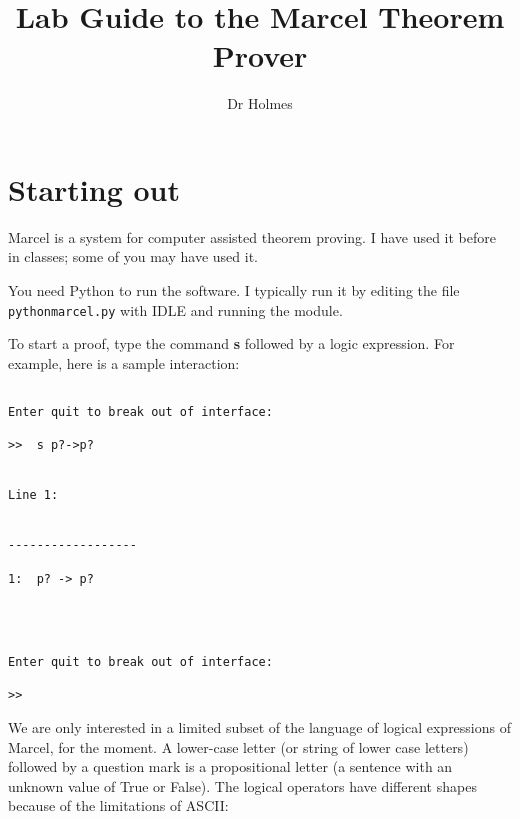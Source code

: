 \documentclass[12pt]{article}
\title{Lab Guide to the Marcel Theorem Prover}
\author{Dr Holmes}
\begin{document}
\maketitle

\tableofcontents

\section{Starting out}

Marcel is a system for computer assisted theorem proving.  I have used it before in classes; some of you may have used it.

You need Python to run the software.  I typically run it by editing the file {\tt pythonmarcel.py} with IDLE and running the module.

To start a proof, type the command {\bf s} followed by a logic expression.  For example, here is a sample interaction:

\begin{verbatim}

Enter quit to break out of interface:

>>  s p?->p?


Line 1:


------------------

1:  p? -> p?  




Enter quit to break out of interface:

>>  

\end{verbatim}

We are only interested in a limited subset of the language of logical expressions of Marcel, for the moment.  A lower-case letter (or string of lower case letters) followed by a question mark is a propositional letter (a sentence with an unknown value of True or False).  The logical operators have different shapes because
of the limitations of ASCII:  

\end{document}
